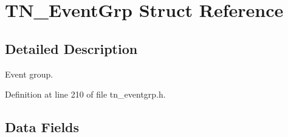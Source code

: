 \hypertarget{structTN__EventGrp}{\section{T\+N\+\_\+\+Event\+Grp Struct Reference}
\label{structTN__EventGrp}
}


\subsection{Detailed Description}
Event group. 

Definition at line 210 of file tn\+\_\+eventgrp.\+h.

\subsection*{Data Fields}
